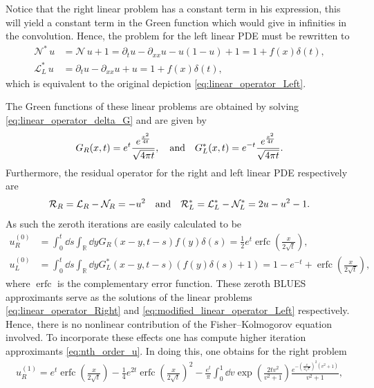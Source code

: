 \documentclass[amsmath,amssymb,amsfonts,aps,pre,preprint,superscriptaddress,bibnotes,showpacs,showkeys,longbibliography]{revtex4-1}
\newcommand{\pa}{\partial}
\DeclareMathOperator{\erfc}{erfc}
\begin{document}
Notice that the right linear problem has a constant term in his expression, this will yield a constant term in the Green function which would give in infinities in the convolution. Hence, the problem for the left linear PDE must be rewritten to
\begin{align}\label{eq:modified_nonlinear_operator_Left}
    \mathcal{N}^*\, u &=\mathcal{N}\, u+1= \pa_t u -\pa_{xx}u - u(1-u)+1=1+f(x)\delta(t),\\
    \mathcal{L}^*_L \, u &=\pa_t u -\pa_{xx}u +u=1+f(x)\delta(t),
    \label{eq:modified_linear_operator_Left}
\end{align}
which is equivalent to the original depiction \eqref{eq:linear_operator_Left}.

The Green functions of these linear problems are obtained by solving \eqref{eq:linear_operator_delta_G} and are given by
\begin{align}
    G_R(x,t) = e^{t}\frac{e^{\frac{x^2}{4 t}}}{\sqrt{4 \pi t}}, \qq{and}
    G^*_L(x,t) = e^{-t}\frac{e^{\frac{x^2}{4 t}}}{\sqrt{4 \pi t}}.
\end{align}
 Furthermore, the residual operator for the right and left linear PDE respectively are
\begin{equation}\label{eq:Risidual_operator_right_and_left}
    \mathcal{R}_R = \mathcal{L}_R-\mathcal{N}_R=-u^2 \qq{and} \mathcal{R}^*_L = \mathcal{L}^*_L-\mathcal{N}^*_L=  2u-u^2-1.
\end{equation}
As such the zeroth iterations are easily calculated to be 
\begin{align}\label{eq:BLUES_zero_iteration_Right}
       u^{(0)}_R &= \int_{0}^{t} \dd{s}\int_{\mathbb{R}} \dd{y} G_R(x-y,t-s) f(y)\delta(s) 
       = \frac{1}{2} e^t \erfc\left(\frac{x}{2 \sqrt{t}}\right),\\
       u^{(0)}_L &= \int_{0}^{t} \dd{s}\int_{\mathbb{R}} \dd{y} G^*_L(x-y,t-s) (f(y)\delta(s)+1) 
       =  1- e^{-t} +\erfc\left(\frac{x}{2 \sqrt{t}}\right),
       \label{eq:BLUES_zero_iteration_Left}
    \end{align}
where $\erfc$ is the complementary error function. These zeroth BLUES approximants serve as the solutions of the linear problems \eqref{eq:linear_operator_Right} and \eqref{eq:modified_linear_operator_Left} respectively. Hence, there is no nonlinear contribution of the Fisher–Kolmogorov equation involved. To incorporate these effects one has compute higher iteration approximants \eqref{eq:nth_order_u}. In doing this, one obtains for the right problem
\begin{multline}\label{eq:BLUES_First_iteration_Right}
    u^{(1)}_R =e^t \erfc\left(\frac{x}{2 \sqrt{t}}\right)-\frac{1}{4} e^{2 t} \erfc\left(\frac{x}{2 \sqrt{t}}\right)^2
    - \frac{e^t}{\pi}\int_0^1 \dd{v}\exp \left(\frac{2 t v^2}{v^2+1}\right)
    \frac{ e^{-\left(\frac{x}{2 \sqrt{t}}\right)^2\left(v^2+1\right) }}{v^2+1},
\end{multline}
\end{document}
